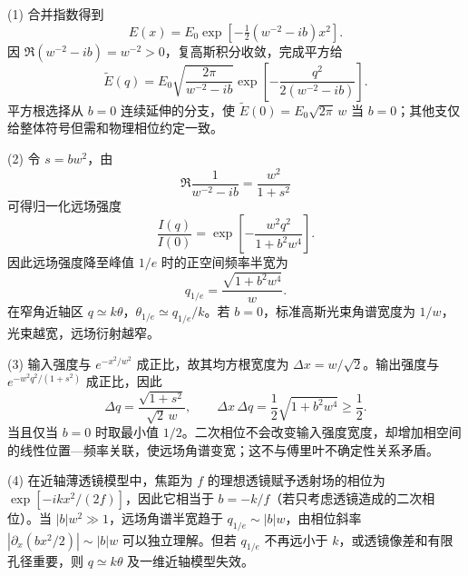 (1) 合并指数得到
\[
E(x)=E_0\exp[-\tfrac12(w^{-2}-ib)x^2].
\]
因 \(\Re(w^{-2}-ib)=w^{-2}>0\)，复高斯积分收敛，完成平方给
\[
\widetilde E(q)
=E_0\sqrt{\frac{2\pi}{w^{-2}-ib}}
\exp\left[-\frac{q^2}{2(w^{-2}-ib)}\right].
\]
平方根选择从 \(b=0\) 连续延伸的分支，使 \(\widetilde E(0)=E_0\sqrt{2\pi}\,w\) 当 \(b=0\)；其他支仅给整体符号但需和物理相位约定一致。

(2) 令 \(s=bw^2\)，由
\[
\Re\frac1{w^{-2}-ib}=\frac{w^2}{1+s^2}
\]
可得归一化远场强度
\[
\frac{I(q)}{I(0)}
=\exp\left[-\frac{w^2q^2}{1+b^2w^4}\right].
\]
因此远场强度降至峰值 \(1/e\) 时的正空间频率半宽为
\[
q_{1/e}=\frac{\sqrt{1+b^2w^4}}{w}.
\]
在窄角近轴区 \(q\simeq k\theta\)，\(\theta_{1/e}\simeq q_{1/e}/k\)。若 \(b=0\)，标准高斯光束角谱宽度为 \(1/w\)，光束越宽，远场衍射越窄。

(3) 输入强度与 \(e^{-x^2/w^2}\) 成正比，故其均方根宽度为 \(\Delta x=w/\sqrt2\)。输出强度与 \(e^{-w^2q^2/(1+s^2)}\) 成正比，因此
\[
\Delta q=\frac{\sqrt{1+s^2}}{\sqrt2\,w},\qquad
\Delta x\,\Delta q=\frac12\sqrt{1+b^2w^4}\ge\frac12.
\]
当且仅当 \(b=0\) 时取最小值 \(1/2\)。二次相位不会改变输入强度宽度，却增加相空间的线性位置—频率关联，使远场角谱变宽；这不与傅里叶不确定性关系矛盾。

(4) 在近轴薄透镜模型中，焦距为 \(f\) 的理想透镜赋予透射场的相位为 \(\exp[-ikx^2/(2f)]\)，因此它相当于 \(b=-k/f\)（若只考虑透镜造成的二次相位）。当 \(|b|w^2\gg1\)，远场角谱半宽趋于 \(q_{1/e}\sim|b|w\)，由相位斜率 \(|\partial_x(bx^2/2)|\sim |b|w\) 可以独立理解。但若 \(q_{1/e}\) 不再远小于 \(k\)，或透镜像差和有限孔径重要，则 \(q\simeq k\theta\) 及一维近轴模型失效。

